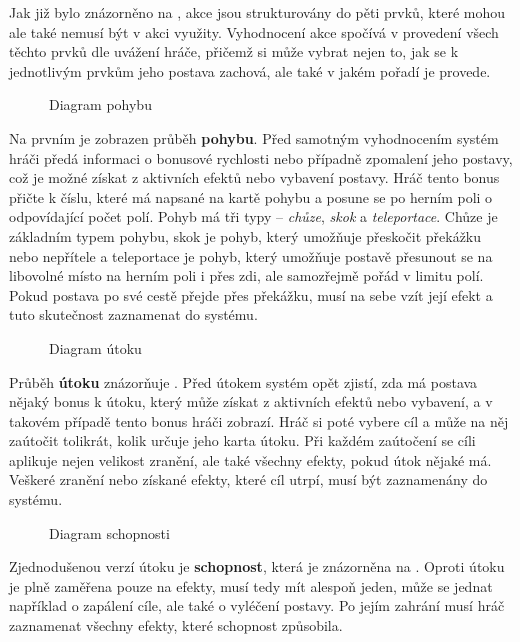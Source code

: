 Jak již bylo znázorněno na , akce jsou strukturovány do pěti prvků, které mohou ale také nemusí být v akci využity. Vyhodnocení akce spočívá v provedení všech těchto prvků dle uvážení hráče, přičemž si může vybrat nejen to, jak se k jednotlivým prvkům jeho postava zachová, ale také v jakém pořadí je provede.

\begin{figure}[h]
    \centering
    \caption{Diagram pohybu}
    \label{diag:movement}
\end{figure}

Na prvním  je zobrazen průběh \textbf{pohybu}. Před samotným vyhodnocením systém hráči předá informaci o bonusové rychlosti nebo případně zpomalení jeho postavy, což je možné získat z aktivních efektů nebo vybavení postavy. Hráč tento bonus přičte k číslu, které má napsané na kartě pohybu a posune se po herním poli o odpovídající počet polí. Pohyb má tři typy -- \textit{chůze}, \textit{skok} a \textit{teleportace}. Chůze je základním typem pohybu, skok je pohyb, který umožňuje přeskočit překážku nebo nepřítele a teleportace je pohyb, který umožňuje postavě přesunout se na libovolné místo na herním poli i přes zdi, ale samozřejmě pořád v limitu polí. Pokud postava po své cestě přejde přes překážku, musí na sebe vzít její efekt a tuto skutečnost zaznamenat do systému.

\begin{figure}[h]
    \centering
    \caption{Diagram útoku}
    \label{diag:attack}
\end{figure}

Průběh \textbf{útoku} znázorňuje . Před útokem systém opět zjistí, zda má postava nějaký bonus k útoku, který může získat z aktivních efektů nebo vybavení, a v takovém případě tento bonus hráči zobrazí. Hráč si poté vybere cíl a může na něj zaútočit tolikrát, kolik určuje jeho karta útoku. Při každém zaútočení se cíli aplikuje nejen velikost zranění, ale také všechny efekty, pokud útok nějaké má. Veškeré zranění nebo získané efekty, které cíl utrpí, musí být zaznamenány do systému.

\begin{figure}[h]
    \centering
    \caption{Diagram schopnosti}
    \label{diag:skill}
\end{figure}

Zjednodušenou verzí útoku je \textbf{schopnost}, která je znázorněna na . Oproti útoku je plně zaměřena pouze na efekty, musí tedy mít alespoň jeden, může se jednat například o zapálení cíle, ale také o vyléčení postavy. Po jejím zahrání musí hráč zaznamenat všechny efekty, které schopnost způsobila.

